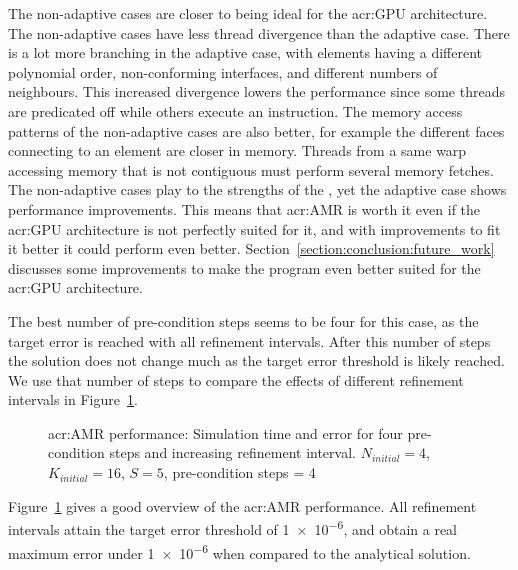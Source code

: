 The non-adaptive cases are closer to being ideal for the \acrshort{acr:GPU} architecture. The
non-adaptive cases have less thread divergence than the adaptive case. There is a lot more branching
in the adaptive case, with elements having a different polynomial order, non-conforming interfaces,
and different numbers of neighbours. This increased divergence lowers the performance since some
threads are predicated off while others execute an instruction. The memory access patterns of the
non-adaptive cases are also better, for example the different faces connecting to an element are
closer in memory. Threads from a same warp accessing memory that is not contiguous must perform
several memory fetches. The non-adaptive cases play to the strengths of the ,
yet the adaptive case shows performance improvements. This means that \acrshort{acr:AMR} is worth it
even if the \acrshort{acr:GPU} architecture is not perfectly suited for it, and with improvements to
fit it better it could perform even better. Section~\ref{section:conclusion:future_work} discusses
some improvements to make the program even better suited for the \acrshort{acr:GPU} architecture.

The best number of pre-condition steps seems to be four for this case, as the target error is
reached with all refinement intervals. After this number of steps the solution does not change much
as the target error threshold is likely reached. We use that number of steps to compare the effects
of different refinement intervals in Figure~\ref{fig:adaptivity_efficiency_C4}.

\begin{figure}[H]
    \centering
    \hfill
    \caption{\Acrlong{acr:AMR} performance: Simulation time and error for four pre-condition steps and increasing refinement interval. \(N_{initial} = 4\), \(K_{initial} = 16\), \(S = 5\), pre-condition steps = 4}\label{fig:adaptivity_efficiency_C4}
\end{figure}

Figure~\ref{fig:adaptivity_efficiency_C4} gives a good overview of the \acrshort{acr:AMR}
performance. All refinement intervals attain the target error threshold of \num{1e-6}, and obtain a
real maximum error under \num{1e-6} when compared to the analytical solution.


